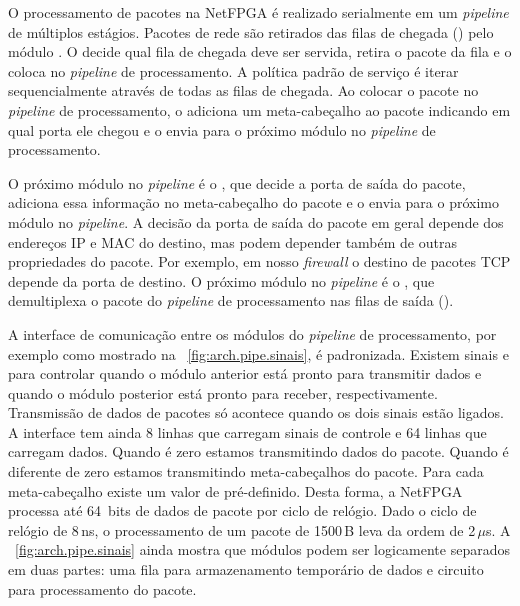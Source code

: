 O processamento de pacotes na NetFPGA é realizado serialmente em um
\emph{pipeline} de múltiplos estágios.  Pacotes de rede são
retirados das filas de chegada () pelo módulo
.  O  decide qual fila de
chegada deve ser servida, retira o pacote da fila e o coloca no
\emph{pipeline} de processamento.  A política padrão de serviço é
iterar sequencialmente através de todas as filas de chegada.  Ao
colocar o pacote no \emph{pipeline} de processamento, o
 adiciona um meta-cabeçalho ao pacote indicando
em qual porta ele chegou e o envia para o próximo módulo no
\emph{pipeline} de processamento.

O próximo módulo no \emph{pipeline} é o ,
que decide a porta de saída do pacote, adiciona essa informação no
meta-cabeçalho do pacote e o envia para o próximo módulo no
\emph{pipeline}.  A decisão da porta de saída do pacote em geral
depende dos endereços IP e MAC do destino, mas podem depender também
de outras propriedades do pacote.  Por exemplo, em nosso
\emph{firewall} o destino de pacotes TCP depende da porta de
destino.  O próximo módulo no \emph{pipeline} é o
, que demultiplexa o pacote do \emph{pipeline}
de processamento nas filas de saída ().

A interface de comunicação entre os módulos do \emph{pipeline} de
processamento, por exemplo como mostrado na
\figstr~\ref{fig:arch.pipe.sinais}, é padronizada.  Existem sinais
 e  para controlar quando o módulo anterior está
pronto para transmitir dados e quando o módulo posterior está pronto
para receber, respectivamente.  Transmissão de dados de pacotes só
acontece quando os dois sinais estão ligados.  A interface tem ainda
8 linhas  que carregam sinais de controle e 64 linhas
 que carregam dados.  Quando  é zero estamos
transmitindo dados do pacote. Quando  é diferente de zero
estamos transmitindo meta-cabeçalhos do pacote.  Para cada
meta-cabeçalho existe um valor de 
pré-definido.\footnotemark{}   Desta forma, a NetFPGA processa até
64~bits de dados de pacote por ciclo de relógio.  Dado o ciclo de
relógio de 8\,ns, o processamento de um pacote de 1500\,B leva da
ordem de 2\,$\mu$s.  A \figstr~\ref{fig:arch.pipe.sinais} ainda
mostra que módulos podem ser logicamente separados em duas partes:
uma fila para armazenamento temporário de dados e circuito para
processamento do pacote.



